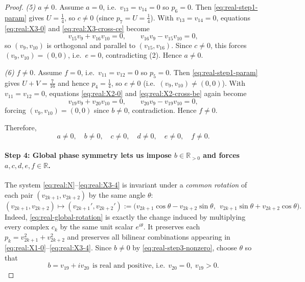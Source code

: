 \documentclass[11pt]{article}
\begin{document}
\begin{proof}
\smallskip
\noindent\emph{(5) $a\neq 0$.}
Assume $a=0$, i.e.\ $v_{13}=v_{14}=0$ so $p_6=0$.
Then \eqref{eq:real-step1-param} gives $U=\tfrac14$, so $c\neq 0$ (since $p_7=U=\tfrac14$).
With $v_{13}=v_{14}=0$, equations \eqref{eq:real:X3-0} and \eqref{eq:real:X3-cross-ce} become
\[
v_{15}v_{9}+v_{16}v_{10}=0,\qquad
v_{16}v_{9}-v_{15}v_{10}=0,
\]
so $(v_9,v_{10})$ is orthogonal and parallel to $(v_{15},v_{16})$.
Since $c\neq 0$, this forces $(v_9,v_{10})=(0,0)$, i.e.\ $e=0$, contradicting (2).
Hence $a\neq 0$.

\smallskip
\noindent\emph{(6) $f\neq 0$.}
Assume $f=0$, i.e.\ $v_{11}=v_{12}=0$ so $p_5=0$.
Then \eqref{eq:real-step1-param} gives $U+V=\tfrac{7}{16}$ and hence $p_4=\tfrac14$,
so $e\neq 0$ (i.e.\ $(v_9,v_{10})\neq(0,0)$).
With $v_{11}=v_{12}=0$, equations \eqref{eq:real:X2-0} and \eqref{eq:real:X2-cross-be} again become
\[
v_{19}v_{9}+v_{20}v_{10}=0,\qquad
v_{20}v_{9}-v_{19}v_{10}=0,
\]
forcing $(v_9,v_{10})=(0,0)$ since $b\neq 0$, contradiction.
Hence $f\neq 0$.

Therefore,
\begin{equation}
a\neq 0,\quad b\neq 0,\quad c\neq 0,\quad d\neq 0,\quad e\neq 0,\quad f\neq 0.
\label{eq:real-step3-nonzero}
\end{equation}

\paragraph{Step 4: Global phase symmetry lets us impose $b\in\mathbb R_{>0}$ and forces $a,c,d,e,f\in\mathbb R$.}
The system \eqref{eq:real:N}--\eqref{eq:real:X3-4} is invariant under a \emph{common rotation} of each pair
$(v_{2k+1},v_{2k+2})$ by the same angle $\theta$:
\begin{equation}
(v_{2k+1},v_{2k+2})\longmapsto
(v_{2k+1}',v_{2k+2}')
:=
\bigl(v_{2k+1}\cos\theta - v_{2k+2}\sin\theta,\ \ v_{2k+1}\sin\theta + v_{2k+2}\cos\theta\bigr).
\label{eq:real-global-rotation}
\end{equation}
Indeed, \eqref{eq:real-global-rotation} is exactly the change induced by multiplying every complex $c_k$
by the same unit scalar $e^{i\theta}$.
It preserves each $p_k=v_{2k+1}^2+v_{2k+2}^2$ and preserves all bilinear combinations
appearing in \eqref{eq:real:X1-0}--\eqref{eq:real:X3-4}.
Since $b\neq 0$ by \eqref{eq:real-step3-nonzero}, choose $\theta$ so that
\begin{equation}
b=v_{19}+i v_{20}\ \ \text{is real and positive, i.e.}\ \ v_{20}=0,\ v_{19}>0.
\label{eq:real-b-real-positive}
\end{equation}


\end{proof}
\end{document}

